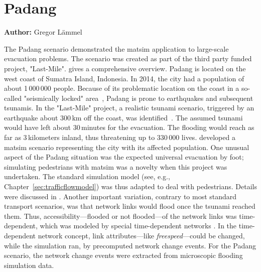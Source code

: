 \section{Padang}
\label{sec:padang}
\hfill \textbf{Author:} Gregor Lämmel


The Padang scenario demonstrated the \gls{matsim} application to large-scale evacuation problems. The scenario was created as part of the third party funded project, "Last-Mile". \citet{00TaubenboeckEtAl2012ConcludingLastMilePaperNatHazards} gives a comprehensive overview.
Padang is located on the west coast of Sumatra Island, Indonesia. In 2014, the city had a population of about 1\,000\,000 people. 
Because of its problematic location on the coast in a so-called "seismically locked" area~\citep{McCloskey2010Padang2009Earthquake}, Padang is prone to earthquakes and subsequent tsunamis. In the "Last-Mile" project, a realistic tsunami scenario, triggered by an earthquake about 300\,km off the coast, was identified~\citep{GosebergSchlurmann2009HazardMappingPadang}. The assumed tsunami would have left about 30\,minutes for the evacuation. The flooding would reach as far as 3\,kilometers inland, thus threatening up to 330\,000 lives. \citet{Laemmel_PhDThesis_2011} developed a \gls{matsim} scenario representing the city with its affected population. One unusual aspect of the Padang situation was the expected universal evacuation by foot; simulating pedestrians with \gls{matsim} was a novelty when this project was undertaken. The standard simulation model (see, e.g., Chapter~\ref{sec:trafficflowmodel}) was thus adapted to deal with pedestrians. 
Details were discussed in \citet{00LaemmelKluepfelNagel2009EvacPadangAtBookTimmermanns}. Another important variation, contrary to most standard transport scenarios, was that network links would flood once the tsunami reached them. Thus, accessibility---flooded or not flooded---of the network links was time-dependent, which was modeled by special time-dependent networks \citep{00LaemmelGretherNagel2009TimeDependentNetworks}. In the time-dependent network concept, link attributes---like \emph{freespeed}---could be changed, while the simulation ran, by precomputed network change events. For the Padang scenario, the network change events were extracted from microscopic flooding simulation data.


